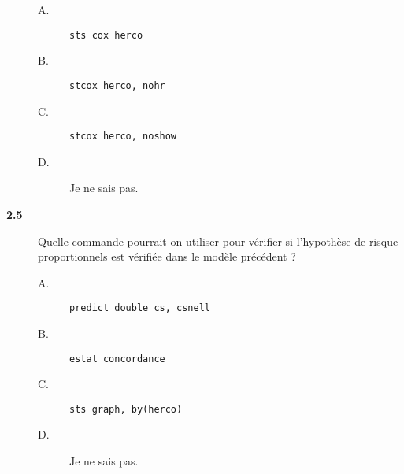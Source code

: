 \begin{description}
\begin{description}
\item[A.] \verb|sts cox herco|
\item[B.] \verb|stcox herco, nohr|
\item[C.] \verb|stcox herco, noshow|
\item[D.] Je ne sais pas.
\end{description}
\item[\bf 2.5] Quelle commande pourrait-on utiliser pour vérifier si
  l'hypothèse de risque proportionnels est vérifiée dans le modèle précédent
  ? 
\begin{description}
\item[A.] \verb|predict double cs, csnell|
\item[B.] \verb|estat concordance|
\item[C.] \verb|sts graph, by(herco)|
\item[D.] Je ne sais pas.
\end{description}
\end{description}
